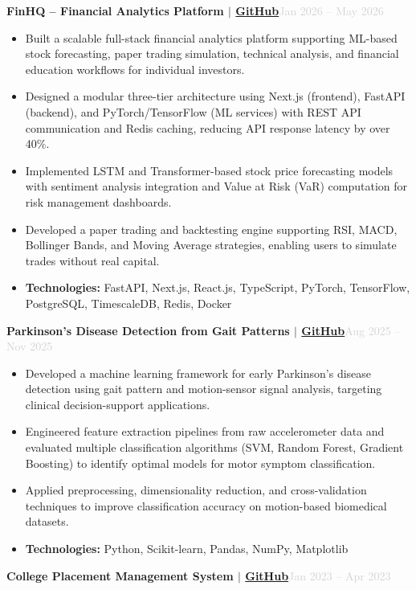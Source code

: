 \documentclass[a4paper,10.5pt]{article}
\newcommand{\resumeProject}[2]{%
  \vspace{3pt}%
  \noindent\textbf{\normalsize #1}\hfill\textcolor{lightgray}{\small #2}%
  \vspace{1pt}%
}
\newcommand{\resumeItem}[1]{%
  \item\small{#1}%
}
\newcommand{\resumeItemListStart}{%
  \begin{itemize}[leftmargin=0.18in, itemsep=2pt, topsep=3pt, parsep=0pt]%
}
\newcommand{\resumeItemListEnd}{%
  \end{itemize}\vspace{2pt}%
}
\begin{document}
\resumeProject
  {FinHQ -- Financial Analytics Platform $|$ \href{https://github.com/Abhijith-E/FinHQ}{GitHub}}{Jan 2026 -- May 2026}

\resumeItemListStart
  \resumeItem{
    Built a scalable full-stack financial analytics platform supporting ML-based stock forecasting, paper trading simulation, technical analysis, and financial education workflows for individual investors.
  }
  \resumeItem{
    Designed a modular three-tier architecture using Next.js (frontend), FastAPI (backend), and PyTorch/TensorFlow (ML services) with REST API communication and Redis caching, reducing API response latency by over 40\%.
  }
  \resumeItem{
    Implemented LSTM and Transformer-based stock price forecasting models with sentiment analysis integration and Value at Risk (VaR) computation for risk management dashboards.
  }
  \resumeItem{
    Developed a paper trading and backtesting engine supporting RSI, MACD, Bollinger Bands, and Moving Average strategies, enabling users to simulate trades without real capital.
  }
  \resumeItem{
    \textbf{Technologies:} FastAPI, Next.js, React.js, TypeScript, PyTorch, TensorFlow, PostgreSQL, TimescaleDB, Redis, Docker
  }
\resumeItemListEnd

\vspace{4pt}

\resumeProject
  {Parkinson's Disease Detection from Gait Patterns $|$ \href{https://github.com/Abhijith-E/Parkinsons_Disease_Detection}{GitHub}}{Aug 2025 -- Nov 2025}

\resumeItemListStart
  \resumeItem{
    Developed a machine learning framework for early Parkinson's disease detection using gait pattern and motion-sensor signal analysis, targeting clinical decision-support applications.
  }
  \resumeItem{
    Engineered feature extraction pipelines from raw accelerometer data and evaluated multiple classification algorithms (SVM, Random Forest, Gradient Boosting) to identify optimal models for motor symptom classification.
  }
  \resumeItem{
    Applied preprocessing, dimensionality reduction, and cross-validation techniques to improve classification accuracy on motion-based biomedical datasets.
  }
  \resumeItem{
    \textbf{Technologies:} Python, Scikit-learn, Pandas, NumPy, Matplotlib
  }
\resumeItemListEnd

\vspace{4pt}

\resumeProject
  {College Placement Management System $|$ \href{https://github.com/Abhijith-E/college-placement-management-system}{GitHub}}{Jan 2023 -- Apr 2023}
\end{document}
